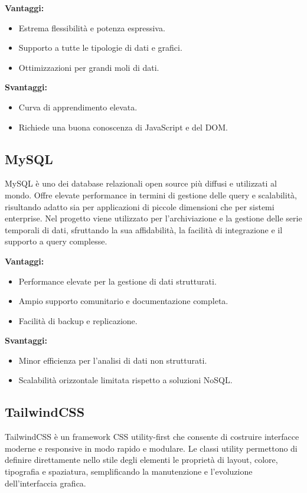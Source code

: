\textbf{Vantaggi:}
\begin{itemize}
    \item Estrema flessibilità e potenza espressiva.
    \item Supporto a tutte le tipologie di dati e grafici.
    \item Ottimizzazioni per grandi moli di dati.
\end{itemize}

\textbf{Svantaggi:}
\begin{itemize}
    \item Curva di apprendimento elevata.
    \item Richiede una buona conoscenza di JavaScript e del DOM.
\end{itemize}

\subsection{MySQL}

MySQL è uno dei database relazionali open source più diffusi e utilizzati al mondo. Offre elevate performance in termini di gestione delle query e scalabilità, risultando adatto sia per applicazioni di piccole dimensioni che per sistemi enterprise. Nel progetto viene utilizzato per l’archiviazione e la gestione delle serie temporali di dati, sfruttando la sua affidabilità, la facilità di integrazione e il supporto a query complesse.

\textbf{Vantaggi:}
\begin{itemize}
    \item Performance elevate per la gestione di dati strutturati.
    \item Ampio supporto comunitario e documentazione completa.
    \item Facilità di backup e replicazione.
\end{itemize}

\textbf{Svantaggi:}
\begin{itemize}
    \item Minor efficienza per l’analisi di dati non strutturati.
    \item Scalabilità orizzontale limitata rispetto a soluzioni NoSQL.
\end{itemize}

\subsection{TailwindCSS}

TailwindCSS è un framework CSS utility-first che consente di costruire interfacce moderne e responsive in modo rapido e modulare. Le classi utility permettono di definire direttamente nello stile degli elementi le proprietà di layout, colore, tipografia e spaziatura, semplificando la manutenzione e l’evoluzione dell’interfaccia grafica.

